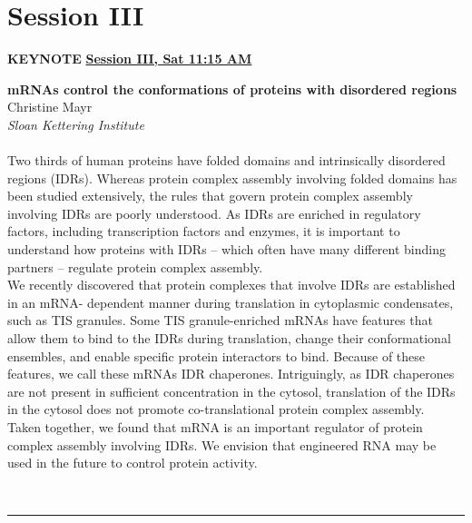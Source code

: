 \documentclass[titlepage,oneside,openany,10pt]{book}
\newenvironment{oralabskeynote}[3]
        {
        \vspace{0.3cm}
        \noindent\textbf{#1}\\%
        #2\\%
        \textit{#3}\\\\%
        }
        {
        \\
        \noindent\rule{15cm}{0.5pt}%
        }
\begin{document}
\newpage

\section*{Session III}
\label{sec:sessIII}

\vspace{0.5cm}

\begin{shaded}
\noindent\textbf{KEYNOTE} \hfill \textbf{\underline{Session III, Sat 11:15 AM}}

\begin{oralabskeynote}
	{mRNAs control the conformations of proteins with disordered regions}
	{Christine Mayr}
	{Sloan Kettering Institute}
	Two thirds of human proteins have folded domains and intrinsically disordered regions (IDRs). 
	Whereas protein complex assembly involving folded domains has been studied extensively, the 
	rules that govern protein complex assembly involving IDRs are poorly understood. As IDRs are 
	enriched in regulatory factors, including transcription factors and enzymes, it is important to 
	understand how proteins with IDRs – which often have many different binding partners – 
	regulate protein complex assembly. \\
	We recently discovered that protein complexes that involve IDRs are established in an mRNA-
	dependent manner during translation in cytoplasmic condensates, such as TIS granules. Some 
	TIS granule-enriched mRNAs have features that allow them to bind to the IDRs during 
	translation, change their conformational ensembles, and enable specific protein interactors to 
	bind. Because of these features, we call these mRNAs IDR chaperones. Intriguingly, as IDR 
	chaperones are not present in sufficient concentration in the cytosol, translation of the IDRs in 
	the cytosol does not promote co-translational protein complex assembly. \\
	Taken together, we found that mRNA is an important regulator of protein complex assembly 
	involving IDRs. We envision that engineered RNA may be used in the future to control protein 
	activity.
	\label{MayrC}
\end{oralabskeynote}
\end{shaded}
\end{document}
